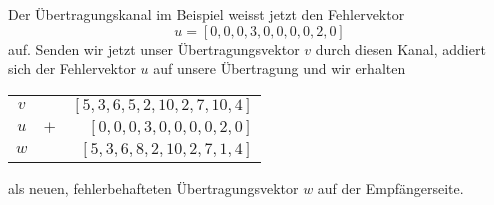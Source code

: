 Der Übertragungskanal im Beispiel weisst jetzt den Fehlervektor 
\[
u = [0, 0, 0, 3, 0, 0, 0, 0, 2, 0]
\]
auf.
Senden wir jetzt unser Übertragungsvektor $v$ durch diesen Kanal, addiert sich der Fehlervektor $u$ auf unsere Übertragung und wir erhalten 
\begin{center}
	
	\begin{tabular}{c | c r }
		$v$ & & $[5,3,6,5,2,10,2,7,10,4]$\\
		$u$ & $+$ & $[0,0,0,3,0,0,0,0,2,0]$\\
		\hline
		$w$ & & $[5,3,6,8,2,10,2,7,1,4]$\\
	\end{tabular}
	
	
\end{center}
als neuen, fehlerbehafteten Übertragungsvektor $w$ auf der Empfängerseite.
%
%
%
%
%
%
%
%
%
